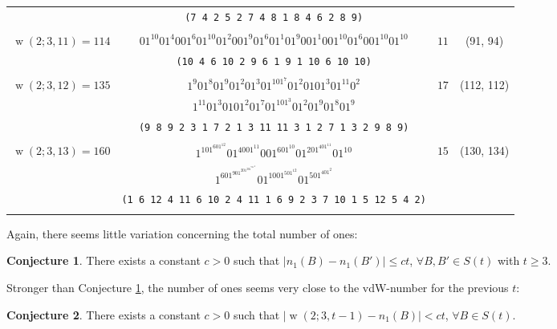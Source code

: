 \documentclass[final,3p,times]{elsarticle}
\theoremstyle{definition}
\newtheorem{conj}{Conjecture}[section]
\renewcommand{\leq}{\le} %
\providecommand{\abs}[1]{\lvert #1 \rvert}
\DeclareMathOperator{\vdw}{w}
\begin{document}
{\begin{longtable}[c]{|c|c|c|c|}
{} & {\tt (7 4 2 5 2 7 4 8 1 8 4 6 2 8 9)} & {}& {}\\
{} & {\tt } & {}& {}\\
{$\vdw(2; 3, 11) = 114$} & {$01^{10}01^{4}001^{6}01^{10}01^{2}001^{9}01^{6}01^{1}01^{9}001^{1}001^{10}01^{6}001^{10}01^{10}$} & {$11$}& {(91, 94)}\\
{} & {\tt (10 4 6 10 2 9 6 1 9 1 10 6 10 10)} & {}& {}\\
{} & {\tt } & {}& {}\\
{$\vdw(2; 3, 12) = 135$} &
{$1^{9}01^{8}01^{9}01^{2}01^{3}01^101^{7}01^{2}0101^{3}01^{11}0^{2}$} & {$17$}& {(112, 112)}\\
{} & {$1^{11}01^{3}0101^{2}01^{7}01^101^{3}01^{2}01^{9}01^{8}01^{9}$} & {$$}& {}\\
{} & {\tt (9 8 9 2 3 1 7 2 1 3 11 11 3 1 2 7 1 3 2 9 8 9)} & {}& {}\\
{} & {\tt } & {}& {}\\
{$\vdw(2; 3, 13) = 160$} &
{$1^101^601^{12}01^4001^{11}001^601^{10}01^201^401^{11}01^10$} & {$15$}& {(130, 134)}\\
{} & {$1^601^901^201^301^701^{10}01^1001^501^{12}01^501^401^2$} & {$$}& {}\\
{} & {\tt (1 6 12 4 11 6 10 2 4 11 1 6 9 2 3 7 10 1 5 12 5 4 2)} & {}& {}\\
{} & {\tt } & {}& {}\\
\hline
\hline
\end{longtable}
}

Again, there seems little variation concerning the total number of ones:
\begin{conj}\label{conj-2v}
There exists a constant $c > 0$ such that
$ \abs{n_1(B)-n_1(B')} \leq ct$, $\forall{B,B'}\in S(t)$ with $t\geq 3$.
\end{conj}

Stronger than Conjecture \ref{conj-2v}, the number of ones seems very close to the vdW-number for the previous $t$:
\begin{conj}\label{conj-3a}
There exists a constant $c > 0$ such that
$ \abs{\vdw(2; 3, t-1) - n_1(B)} < c t$, $\forall{B}\in S(t)$.
\end{conj}
\end{document}
